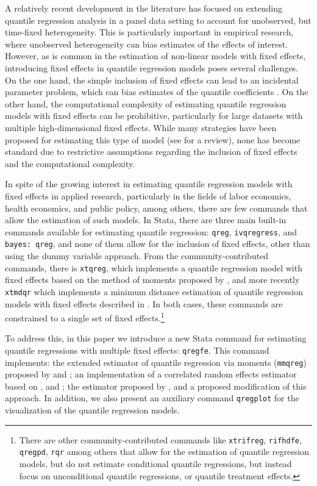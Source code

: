 \documentclass[bib]{statapress}
\begin{document}
A relatively recent development in the literature has focused on
extending quantile regression analysis in a panel data setting to
account for unobserved, but time-fixed heterogeneity. This is
particularly important in empirical research, where unobserved
heterogeneity can bias estimates of the effects of interest. However, as
is common in the estimation of non-linear models with fixed effects,
introducing fixed effects in quantile regression models poses several
challenges. On the one hand, the simple inclusion of fixed effects can
lead to an incidental parameter problem, which can bias estimates of the
quantile coefficients \citep{neymanscott1948, lancaster2000}. On the
other hand, the computational complexity of estimating quantile
regression models with fixed effects can be prohibitive, particularly
for large datasets with multiple high-dimensional fixed effects. While
many strategies have been proposed for estimating this type of model
(see \citet{galvao2017quantile} for a review), none has become standard
due to restrictive assumptions regarding the inclusion of fixed effects
and the computational complexity.

In spite of the growing interest in estimating quantile regression
models with fixed effects in applied research, particularly in the
fields of labor economics, health economics, and public policy, among
others, there are few commands that allow the estimation of such models.
In Stata, there are three main built-in commands available for
estimating quantile regression: \texttt{qreg}, \texttt{ivqregress}, and
\texttt{bayes:\ qreg}, and none of them allow for the inclusion of fixed
effects, other than using the dummy variable approach. From the
community-contributed commands, there is \texttt{xtqreg}, which
implements a quantile regression model with fixed effects based on the
method of moments proposed by \citet{mss2019}, and more recently
\texttt{xtmdqr} which implements a minimum distance estimation of
quantile regression models with fixed effects described in
\citet{melly2023}. In both cases, these commands are constrained to a
single set of fixed effects.\footnote{There are other
  community-contributed commands like \texttt{xtrifreg},
  \texttt{rifhdfe}, \texttt{qregpd}, \texttt{rqr} among others that
  allow for the estimation of quantile regression models, but do not
  estimate conditional quantile regressions, but instead focus on
  unconditional quantile regressions, or quantile treatment effects.}

To address this, in this paper we introduce a new Stata command for
estimating quantile regressions with multiple fixed effects:
\texttt{qregfe}. This command implements: the extended estimator of
quantile regression via moments (\texttt{mmqreg}) proposed by
\citet{mss2019} and \citet{riosavila2024}; an implementation of a
correlated random effects estimator based on \citet{abrevaya2008},
\citet{wooldridge2019} and \citet[Ch12.10.3]{wooldridge2010}; the
estimator proposed by \citet{canay2011}, and a proposed modification of
this approach. In addition, we also present an auxiliary command
\texttt{qregplot} for the visualization of the quantile regression
models.
\end{document}
